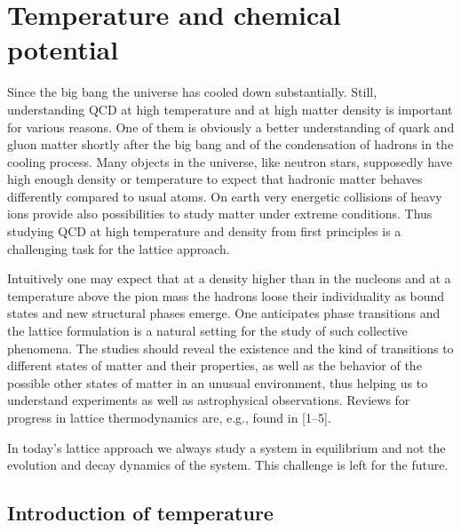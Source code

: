 
\chapter{Temperature and chemical potential}

Since the big bang the universe has cooled down substantially. Still,
understanding QCD at high temperature and at high matter density is important
for various reasons. One of them is obviously a better understanding of quark
and gluon matter shortly after the big bang and of the condensation of hadrons
in the cooling process. Many objects in the universe, like neutron stars,
supposedly have high enough density or temperature to expect that hadronic
matter behaves differently compared to usual atoms. On earth very energetic
collisions of heavy ions provide also possibilities to study matter under
extreme conditions. Thus studying QCD at high temperature and density from
first principles is a challenging task for the lattice approach.

Intuitively one may expect that at a density higher than in the nucleons and at
a temperature above the pion mass the hadrons loose their individuality as
bound states and new structural phases emerge. One anticipates phase
transitions and the lattice formulation is a natural setting for the study of
such collective phenomena. The studies should reveal the existence and the kind
of transitions to different states of matter and their properties, as well as
the behavior of the possible other states of matter in an unusual environment,
thus helping us to understand experiments as well as astrophysical
observations. Reviews for progress in lattice thermodynamics are, e.g., found
in [1--5].

In today's lattice approach we always study a system in equilibrium and not the
evolution and decay dynamics of the system. This challenge is left for the
future.

\section{Introduction of temperature}

